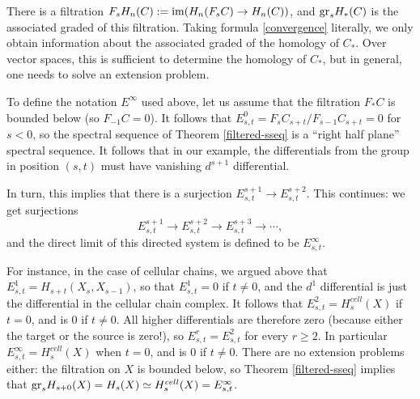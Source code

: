 There is a filtration $F_s H_n(C):=\operatorname{im}(H_n(F_s C) \to H_n(C))$, and $\mathrm{gr}_s
H_\ast(C)$ is the associated graded of this filtration. Taking formula
\eqref{convergence} literally, we only obtain information about the associated
graded of the homology of $C_\ast$. Over vector spaces, this is sufficient to
determine the homology of $C_\ast$, but in general, one needs to solve an
extension problem.

To define the notation $E^\infty$ used above, let us assume that the filtration
$F_\ast C$ is bounded below (so $F_{-1} C = 0$). It follows that $E^0_{s,t} =
F_s C_{s+t}/F_{s-1} C_{s+t} = 0$ for $s<0$, so the spectral sequence of Theorem
\ref{filtered-sseq} is a ``right half plane'' spectral sequence. It follows
that in our example, the differentials from the group in position $(s,t)$ must
have vanishing $d^{s+1}$ differential.

In turn, this implies that there is a surjection $E^{s+1}_{s,t} \to
E^{s+2}_{s,t}$. This continues: we get surjections
$$E^{s+1}_{s,t}\to E^{s+2}_{s,t}\to E^{s+3}_{s,t}\to\cdots,$$
and the direct limit of this directed system is defined to be $E^\infty_{s,t}$.

For instance, in the case of cellular chains, we argued above that $E^1_{s,t} =
H_{s+t}(X_s, X_{s-1})$, so that $E^1_{s,t} = 0$ if $t\neq 0$, and the $d^1$
differential is just the differential in the cellular chain complex. It follows
that $E^2_{s,t} = H_s^{cell}(X)$ if $t=0$, and is $0$ if $t\neq 0$. All higher
differentials are therefore zero (because either the target or the source is
zero!), so $E^r_{s,t} = E^2_{s,t}$ for every $r\geq 2$. In particular
$E^\infty_{s,t} = H_s^{cell}(X)$ when $t=0$, and is $0$ if $t\neq 0$. There are
no extension problems either: the filtration on $X$ is bounded below, so
Theorem \ref{filtered-sseq} implies that $\mathrm{gr}_s H_{s+0}(X) = H_s(X) \simeq
H_s^{cell}(X) = E^\infty_{s,t}$.


